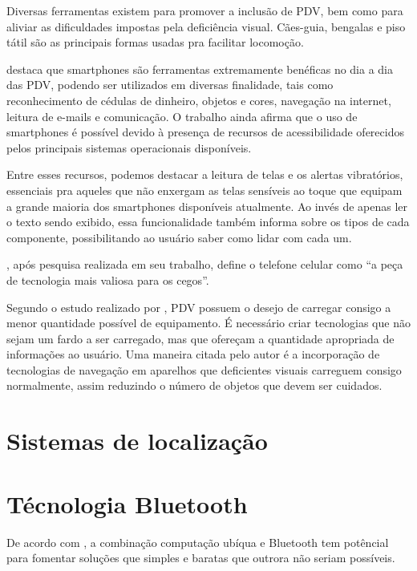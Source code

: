 \documentclass[english,brazilian]{UNISINOSmonografia}
\begin{document}
Diversas ferramentas existem para promover a inclusão de PDV, bem como para aliviar as dificuldades impostas pela deficiência visual. Cães-guia, bengalas e piso tátil são as principais formas usadas pra facilitar locomoção.

 destaca que smartphones são ferramentas extremamente benéficas no dia a dia das PDV, podendo ser utilizados em diversas finalidade, tais como reconhecimento de cédulas de dinheiro, objetos e cores, navegação na internet, leitura de e-mails e comunicação. O trabalho ainda afirma que o uso de smartphones é possível devido à presença de recursos de acessibilidade oferecidos pelos principais sistemas operacionais disponíveis. 

Entre esses recursos, podemos destacar a leitura de telas e os alertas vibratórios, essenciais pra aqueles que não enxergam as telas sensíveis ao toque que equipam a grande maioria dos smartphones disponíveis atualmente. Ao invés de apenas ler o texto sendo exibido, essa funcionalidade também informa sobre os tipos de cada componente, possibilitando ao usuário saber como lidar com cada um.

, após pesquisa realizada em seu trabalho, define o telefone celular como “a peça de tecnologia mais valiosa para os cegos”. 

Segundo o estudo realizado por , PDV possuem o desejo de carregar consigo a menor quantidade possível de equipamento. É necessário criar tecnologias que não sejam um fardo a ser carregado, mas que ofereçam a quantidade apropriada de informações ao usuário. Uma maneira citada pelo autor é a incorporação de tecnologias de navegação em aparelhos que deficientes visuais carreguem consigo normalmente, assim reduzindo o número de objetos que devem ser cuidados.
	
	\section{Sistemas de localização}

	\section{Técnologia Bluetooth}

De acordo com , a combinação computação ubíqua e Bluetooth tem potêncial para fomentar soluções que simples e baratas que outrora não seriam possíveis.
\end{document}
